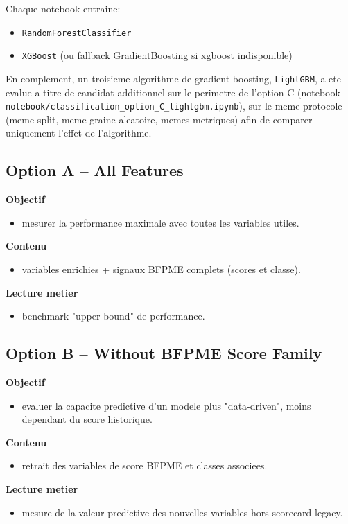 \documentclass[11pt,a4paper]{article}
\begin{document}
Chaque notebook entraine:
\begin{itemize}[leftmargin=1.2cm]
  \item \texttt{RandomForestClassifier}
  \item \texttt{XGBoost} (ou fallback GradientBoosting si xgboost indisponible)
\end{itemize}

En complement, un troisieme algorithme de gradient boosting, \texttt{LightGBM}, a ete evalue
a titre de candidat additionnel sur le perimetre de l'option C (notebook
\texttt{notebook/classification\_option\_C\_lightgbm.ipynb}), sur le meme protocole
(meme split, meme graine aleatoire, memes metriques) afin de comparer uniquement l'effet de
l'algorithme.

\subsection{Option A -- All Features}
\textbf{Objectif}
\begin{itemize}[leftmargin=1.2cm]
  \item mesurer la performance maximale avec toutes les variables utiles.
\end{itemize}
\textbf{Contenu}
\begin{itemize}[leftmargin=1.2cm]
  \item variables enrichies + signaux BFPME complets (scores et classe).
\end{itemize}
\textbf{Lecture metier}
\begin{itemize}[leftmargin=1.2cm]
  \item benchmark "upper bound" de performance.
\end{itemize}

\subsection{Option B -- Without BFPME Score Family}
\textbf{Objectif}
\begin{itemize}[leftmargin=1.2cm]
  \item evaluer la capacite predictive d'un modele plus "data-driven", moins dependant du score historique.
\end{itemize}
\textbf{Contenu}
\begin{itemize}[leftmargin=1.2cm]
  \item retrait des variables de score BFPME et classes associees.
\end{itemize}
\textbf{Lecture metier}
\begin{itemize}[leftmargin=1.2cm]
  \item mesure de la valeur predictive des nouvelles variables hors scorecard legacy.
\end{itemize}
\end{document}
